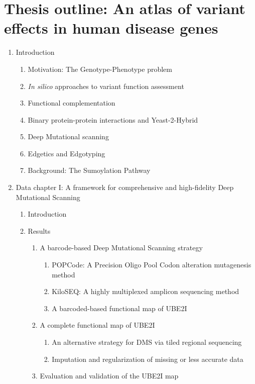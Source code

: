 \documentclass[12pt]{article}
\begin{document}
\section*{Thesis outline: An atlas of variant effects in human disease genes}
\begin{enumerate}
	\item Introduction
	\begin{enumerate}
		\item Motivation: The Genotype-Phenotype problem
		\item \textit{In silico} approaches to variant function assessment
		\item Functional complementation
		\item Binary protein-protein interactions and Yeast-2-Hybrid
		\item Deep Mutational scanning
		\item Edgetics and Edgotyping
		\item Background: The Sumoylation Pathway
	\end{enumerate}
	\item Data chapter I: A framework for comprehensive and high-fidelity Deep Mutational Scanning
	\begin{enumerate}
		\item Introduction
		\item Results
		\begin{enumerate}
			\item A barcode-based Deep Mutational Scanning strategy
			\begin{enumerate}
				\item POPCode: A Precision Oligo Pool Codon alteration mutagenesis method
				\item KiloSEQ: A highly multiplexed amplicon sequencing method
				\item A barcoded-based functional map of UBE2I
			\end{enumerate}
			\item A complete functional map of UBE2I
			\begin{enumerate}
				\item An alternative strategy for DMS via tiled regional sequencing
				\item Imputation and regularization of missing or less accurate data
			\end{enumerate}
			\item Evaluation and validation of the UBE2I map

\end{enumerate}
\end{enumerate}
\end{enumerate}
\end{document}
